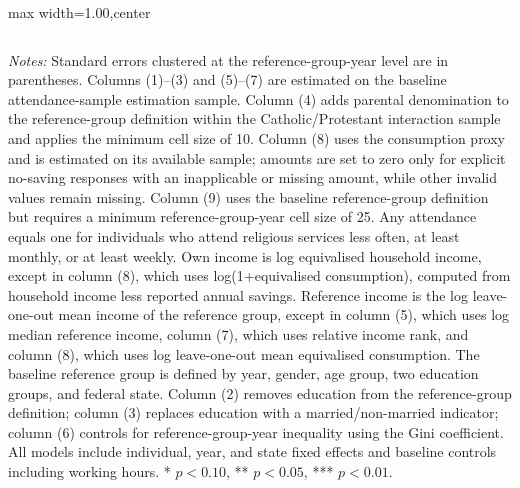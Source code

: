 \begin{table}[!t]
\begin{adjustbox}{max width=1.00\textwidth,center}
\begin{tabular}{lccccccccc}
\bottomrule
\end{tabular}
\end{adjustbox}
\vspace{0.45em}
\begin{minipage}{1.00\textwidth}
\footnotesize
\emph{Notes:} Standard errors clustered at the reference-group-year level are in parentheses. Columns (1)--(3) and (5)--(7) are estimated on the baseline attendance-sample estimation sample. Column (4) adds parental denomination to the reference-group definition within the Catholic/Protestant interaction sample and applies the minimum cell size of 10. Column (8) uses the consumption proxy and is estimated on its available sample; amounts are set to zero only for explicit no-saving responses with an inapplicable or missing amount, while other invalid values remain missing. Column (9) uses the baseline reference-group definition but requires a minimum reference-group-year cell size of 25. Any attendance equals one for individuals who attend religious services less often, at least monthly, or at least weekly. Own income is log equivalised household income, except in column (8), which uses log(1+equivalised consumption), computed from household income less reported annual savings. Reference income is the log leave-one-out mean income of the reference group, except in column (5), which uses log median reference income, column (7), which uses relative income rank, and column (8), which uses log leave-one-out mean equivalised consumption. The baseline reference group is defined by year, gender, age group, two education groups, and federal state. Column (2) removes education from the reference-group definition; column (3) replaces education with a married/non-married indicator; column (6) controls for reference-group-year inequality using the Gini coefficient. All models include individual, year, and state fixed effects and baseline controls including working hours. * \(p<0.10\), ** \(p<0.05\), *** \(p<0.01\).
\end{minipage}
\endgroup
\end{table}
